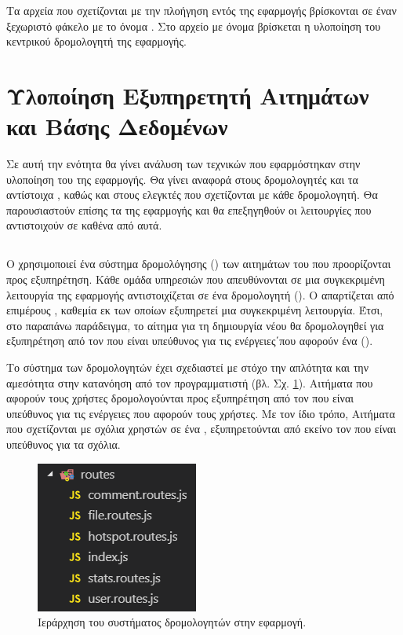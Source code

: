 Τα αρχεία που σχετίζονται με την πλοήγηση εντός της εφαρμογής βρίσκονται σε έναν ξεχωριστό φάκελο με το όνομα . Στο αρχείο με όνομα  βρίσκεται η υλοποίηση του κεντρικού δρομολογητή της εφαρμογής.



\section{Υλοποίηση Εξυπηρετητή Αιτημάτων και Βάσης Δεδομένων}
Σε αυτή την ενότητα θα γίνει ανάλυση των τεχνικών που εφαρμόστηκαν στην υλοποίηση του  της εφαρμογής. Θα γίνει αναφορά στους δρομολογητές και τα αντίστοιχα , καθώς και στους ελεγκτές που σχετίζονται με κάθε δρομολογητή. Θα παρουσιαστούν επίσης τα  της εφαρμογής και θα επεξηγηθούν οι λειτουργίες που αντιστοιχούν σε καθένα από αυτά.



\subsection{}

Ο  χρησιμοποιεί ένα σύστημα δρομολόγησης () των αιτημάτων του  που προορίζονται προς εξυπηρέτηση. Κάθε ομάδα υπηρεσιών που απευθύνονται σε μια συγκεκριμένη λειτουργία της εφαρμογής αντιστοιχίζεται σε ένα δρομολογητή (). Ο  απαρτίζεται από επιμέρους , καθεμία εκ των οποίων εξυπηρετεί μια συγκεκριμένη λειτουργία. Έτσι, στο παραπάνω παράδειγμα, το αίτημα για τη δημιουργία νέου  θα δρομολογηθεί για εξυπηρέτηση από τον  που είναι υπεύθυνος για τις ενέργειες΄που αφορούν ένα  (). 

Το σύστημα των δρομολογητών έχει σχεδιαστεί με στόχο την απλότητα και την αμεσότητα στην κατανόηση από τον προγραμματιστή (βλ. Σχ. \ref{routes}). Αιτήματα που αφορούν τους χρήστες δρομολογούνται προς εξυπηρέτηση από τον  που είναι υπεύθυνος για τις ενέργειες που αφορούν τους χρήστες. Με τον ίδιο τρόπο, Αιτήματα που σχετίζονται με σχόλια χρηστών σε ένα , εξυπηρετούνται από εκείνο τον  που είναι υπεύθυνος για τα σχόλια. 

\begin{figure}[h]
    \centering
    \includegraphics[scale=1]{figures/routes.png}
    \caption{Ιεράρχηση του συστήματος δρομολογητών στην εφαρμογή.}
    \label{routes}
\end{figure}

